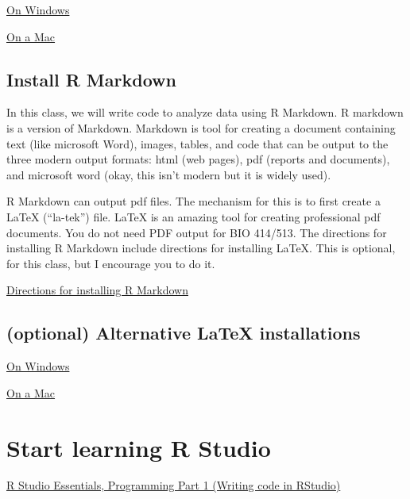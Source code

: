 \documentclass[]{book}
\begin{document}
\href{https://medium.com/@GalarnykMichael/install-r-and-rstudio-on-windows-5f503f708027}{On Windows}

\href{https://medium.com/@GalarnykMichael/install-r-and-rstudio-on-mac-e911606ce4f4}{On a Mac}

\hypertarget{install-r-markdown}{%
\subsection{Install R Markdown}\label{install-r-markdown}}

In this class, we will write code to analyze data using R Markdown. R markdown is a version of Markdown. Markdown is tool for creating a document containing text (like microsoft Word), images, tables, and code that can be output to the three modern output formats: html (web pages), pdf (reports and documents), and microsoft word (okay, this isn't modern but it is widely used).

R Markdown can output pdf files. The mechanism for this is to first create a LaTeX (``la-tek'') file. LaTeX is an amazing tool for creating professional pdf documents. You do not need PDF output for BIO 414/513. The directions for installing R Markdown include directions for installing LaTeX. This is optional, for this class, but I encourage you to do it.

\href{https://bookdown.org/yihui/rmarkdown/installation.html\#installation}{Directions for installing R Markdown}

\hypertarget{optional-alternative-latex-installations}{%
\subsection{(optional) Alternative LaTeX installations}\label{optional-alternative-latex-installations}}

\href{https://medium.com/@sorenlind/create-pdf-reports-using-r-r-markdown-latex-and-knitr-on-windows-10-952b0c48bfa9}{On Windows}

\href{https://medium.com/@sorenlind/create-pdf-reports-using-r-r-markdown-latex-and-knitr-on-macos-high-sierra-e7b5705c9fd}{On a Mac}

\hypertarget{start-learning-r-studio}{%
\section{Start learning R Studio}\label{start-learning-r-studio}}

\href{https://rstudio.com/resources/webinars/programming-part-1-writing-code-in-rstudio/}{R Studio Essentials, Programming Part 1 (Writing code in RStudio)}
\end{document}
